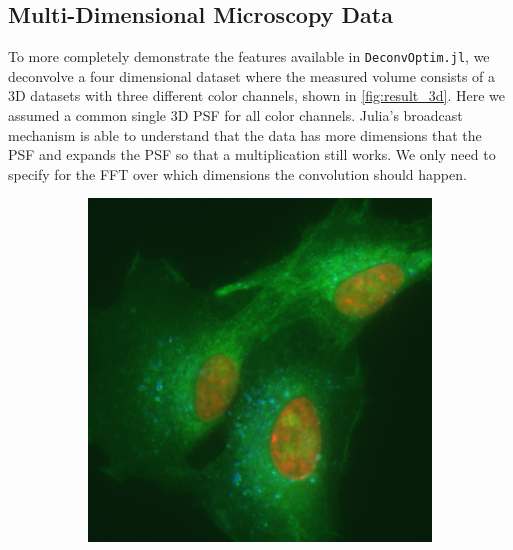 \documentclass{juliacon}
\begin{document}
    \subsection{Multi-Dimensional Microscopy Data}
        To more completely demonstrate the features available in \verb|DeconvOptim.jl|,
        we deconvolve a four dimensional dataset where the measured volume consists of a 3D datasets
        with three different color channels, shown in \autoref{fig:result_3d}.
        Here we assumed a common single 3D PSF for all color channels.
        Julia's broadcast mechanism is able to understand that 
        the data has more dimensions that the PSF and expands the PSF so that a multiplication still works.
        We only need to specify for the FFT over which dimensions the convolution should happen.
        \begin{figure}[h]
            \begin{subfigure}{.25\textwidth}
                \centering
                \includegraphics[width = .95\textwidth]{figures/raw_rgb.png}
            \end{subfigure}%
            \begin{subfigure}{.25\textwidth}
                \centering

\end{subfigure}
\end{figure}
\end{document}
